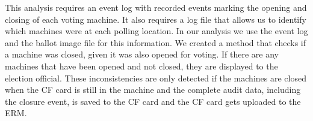This analysis requires an event log with recorded events marking the
opening and closing of each voting machine. It also requires a log
file that allows us to identify which machines were at each polling
location. In our analysis we use the event log and the ballot image
file for this information. We created a method that checks if a
machine was closed, given it was also opened for voting.  
If there are any machines that have been opened and not
closed, they are displayed to the election official.  These
inconsistencies are only detected if the machines are closed when the
CF card is still in the machine and the complete audit data, including
the closure event, is saved to the CF card and the CF card gets uploaded to the
ERM.

